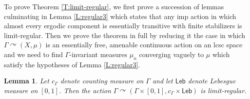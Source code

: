\documentclass[12pt]{article}
\theoremstyle{plain}
\newtheorem{lem}[thm]{Lemma}
\theoremstyle{definition}
\theoremstyle{remark}
\newcommand{\G}{\Gamma}
\def\cc{{\curvearrowright}}
\begin{document}
To prove Theorem \ref{T:limit-regular}, we first prove a succession of lemmas culminating in Lemma \ref{L:regular3} which states that any imp action in which almost every ergodic component is essentially transitive with finite stabilizers is limit-regular. Then we prove the theorem in full by reducing it the case in which $\G \cc (X,\mu)$ is an essentially free,  amenable continuous action on an lcsc space and we need to find $\G$-invariant measures $\mu_n$ converging vaguely to $\mu$ which satisfy the hypotheses of Lemma \ref{L:regular3}.

\begin{lem}\label{L:regular1}
    Let $c_\G$ denote counting measure on $\G$ and let $\mathsf{Leb}$ denote Lebesgue measure on $[0,1]$. Then the action $\G \cc (\G\times [0,1], c_\G \times \mathsf{Leb})$ is limit-regular.
\end{lem}
\end{document}
